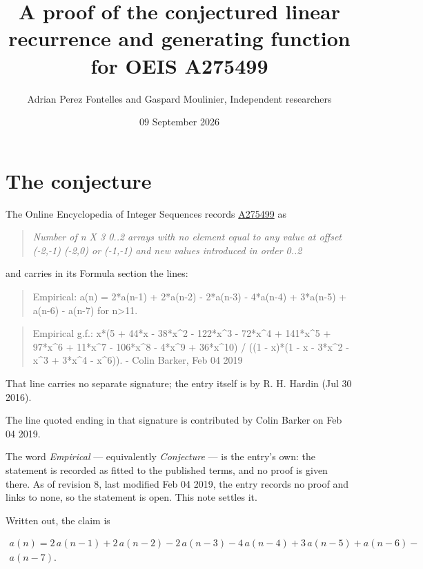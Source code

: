 \documentclass[11pt]{article}
\title{A proof of the conjectured linear recurrence and generating function for OEIS A275499}
\author{Adrian Perez Fontelles and Gaspard Moulinier, Independent researchers}
\date{09 September 2026}
\theoremstyle{definition}
\begin{document}
\maketitle
\section{The conjecture}

The Online Encyclopedia of Integer Sequences records \href{https://oeis.org/A275499}{A275499} as

\begin{quote}\itshape Number of n X 3 0..2 arrays with no element equal to any value at offset (-2,-1) (-2,0) or (-1,-1) and new values introduced in order 0..2\end{quote}

and carries in its Formula section the lines:

\begin{quote}\ttfamily Empirical: a(n) = 2*a(n-1) + 2*a(n-2) - 2*a(n-3) - 4*a(n-4) + 3*a(n-5) + a(n-6) - a(n-7) for n>11.\end{quote}

\begin{quote}\ttfamily Empirical g.f.: x*(5 + 44*x - 38*x\textasciicircum{}2 - 122*x\textasciicircum{}3 - 72*x\textasciicircum{}4 + 141*x\textasciicircum{}5 + 97*x\textasciicircum{}6 + 11*x\textasciicircum{}7 - 106*x\textasciicircum{}8 - 4*x\textasciicircum{}9 + 36*x\textasciicircum{}10) / ((1 - x)*(1 - x - 3*x\textasciicircum{}2 - x\textasciicircum{}3 + 3*x\textasciicircum{}4 - x\textasciicircum{}6)). - Colin Barker, Feb 04 2019\end{quote}

That line carries no separate signature; the entry itself is by R. H. Hardin (Jul 30 2016).

The line quoted ending in that signature is contributed by Colin Barker on Feb 04 2019.

The word {\itshape Empirical} --- equivalently {\itshape Conjecture} --- is the entry's own: the statement is recorded as fitted to the published terms, and no proof is given there. As of revision 8, last modified Feb 04 2019, the entry records no proof and links to none, so the statement is open. This note settles it.

Written out, the claim is

\begin{multline*} a(n) = 2\,a(n-1) + 2\,a(n-2) - 2\,a(n-3) - 4\,a(n-4) + 3\,a(n-5) + a(n-6) - \\ a(n-7). \end{multline*}
\end{document}
